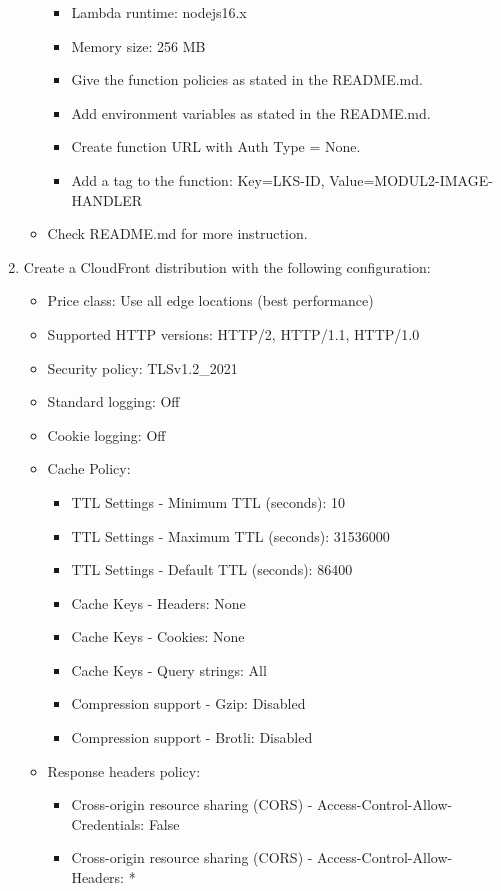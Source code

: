 \documentclass{article}
\begin{document}
\begin{enumerate}
\begin{itemize}
    \begin{itemize}
      \item Lambda runtime: nodejs16.x
      \item Memory size: 256 MB
      \item Give the function policies as stated in the README.md.
      \item Add environment variables as stated in the README.md.
      \item Create function URL with Auth Type = None.
      \item Add a tag to the function: Key=LKS-ID, Value=MODUL2-IMAGE-HANDLER
    \end{itemize}
    \item Check README.md for more instruction.
  \end{itemize}
\item Create a CloudFront distribution with the following configuration:
  \begin{itemize}
    \item Price class: Use all edge locations (best performance)
    \item Supported HTTP versions: HTTP/2, HTTP/1.1, HTTP/1.0
    \item Security policy: TLSv1.2\_2021
    \item Standard logging: Off
    \item Cookie logging: Off
    \item Cache Policy:
    \begin{itemize}
      \item TTL Settings - Minimum TTL (seconds): 10
      \item TTL Settings - Maximum TTL (seconds): 31536000
      \item TTL Settings - Default TTL (seconds): 86400
      \item Cache Keys - Headers: None
      \item Cache Keys - Cookies: None
      \item Cache Keys - Query strings: All
      \item Compression support - Gzip: Disabled
      \item Compression support - Brotli: Disabled
    \end{itemize}
    \item Response headers policy:
    \begin{itemize}
      \item Cross-origin resource sharing (CORS) - Access-Control-Allow-Credentials: False
      \item Cross-origin resource sharing (CORS) - Access-Control-Allow-Headers: *

\end{itemize}
\end{itemize}
\end{enumerate}
\end{document}
